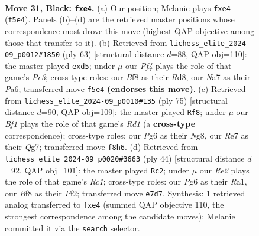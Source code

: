 \documentclass[11pt]{article}
\begin{document}
\clearpage

\begin{figure}[p]\centering
\begin{subfigure}{0.46\textwidth}\centering
\resizebox{\linewidth}{!}{%
\newchessgame
\chessboard[
  setfen={1r3b2/n3rk2/p2p2p1/3P1p1p/Rpq1P3/4R2P/1Q1BNPP1/5K2 b - - 1 31},
  showmover=false,
  pgfstyle=straightmove, color=movearrow, markmove={f5-e4}
]}
\caption{}
\end{subfigure}\hfill
\begin{subfigure}{0.46\textwidth}\centering
\resizebox{\linewidth}{!}{%
\newchessgame
\chessboard[
  setfen={3r2k1/5p2/p2rp2Q/2qP1bp1/2p5/5BPP/P4PK1/2RR4 b - - 0 32},
  showmover=false,
  pgfstyle=straightmove, color=movearrow, markmove={e6-d5}
]}
\caption{}
\end{subfigure}
\\[4pt]
\begin{subfigure}{0.46\textwidth}\centering
\resizebox{\linewidth}{!}{%
\newchessgame
\chessboard[
  setfen={3r2nk/6q1/3r3p/pp1p2P1/2pRp2Q/2P1P2B/PP4RP/6K1 b - - 1 38},
  showmover=false,
  pgfstyle=straightmove, color=movearrow, markmove={d8-f8}
]}
\caption{}
\end{subfigure}\hfill
\begin{subfigure}{0.46\textwidth}\centering
\resizebox{\linewidth}{!}{%
\newchessgame
\chessboard[
  setfen={r1r1b1k1/1p3p1p/2n1pQp1/1q6/1P5P/P4NP1/4PPB1/R1R3K1 w - - 1 23},
  showmover=false,
  pgfstyle=straightmove, color=movearrow, markmove={c1-c2}
]}
\caption{}
\end{subfigure}
\caption{\textbf{Move 31, Black: \texttt{fxe4}.} (a) Our position; Melanie plays \texttt{fxe4} (\texttt{f5e4}). Panels (b)--(d) are the retrieved master positions whose correspondence most drove this move (highest QAP objective among those that transfer to it). (b) Retrieved from \texttt{lichess\_elite\_2024-09\_p0012\#1850} (ply 63) [structural distance $d$=88, QAP obj=110]: the master played \texttt{exd5}; under $\mu$ our \emph{Pf4} plays the role of that game's \emph{Pe3}; cross-type roles: our \emph{B}f8 as their \emph{R}d8, our \emph{N}a7 as their \emph{P}a6; transferred move \texttt{f5e4} \textbf{(endorses this move)}. (c) Retrieved from \texttt{lichess\_elite\_2024-09\_p0010\#135} (ply 75) [structural distance $d$=90, QAP obj=109]: the master played \texttt{Rf8}; under $\mu$ our \emph{Bf1} plays the role of that game's \emph{Rd1} (a \textbf{cross-type} correspondence); cross-type roles: our \emph{P}g6 as their \emph{N}g8, our \emph{R}e7 as their \emph{Q}g7; transferred move \texttt{f8h6}. (d) Retrieved from \texttt{lichess\_elite\_2024-09\_p0020\#3663} (ply 44) [structural distance $d$=92, QAP obj=101]: the master played \texttt{Rc2}; under $\mu$ our \emph{Re2} plays the role of that game's \emph{Rc1}; cross-type roles: our \emph{P}g6 as their \emph{R}a1, our \emph{B}f8 as their \emph{P}f2; transferred move \texttt{e7d7}. Synthesis: 1 retrieved analog transferred to \texttt{fxe4} (summed QAP objective 110, the strongest correspondence among the candidate moves); Melanie committed it via the \texttt{search} selector.}
\label{fig:thought-m61}
\end{figure}
\end{document}
